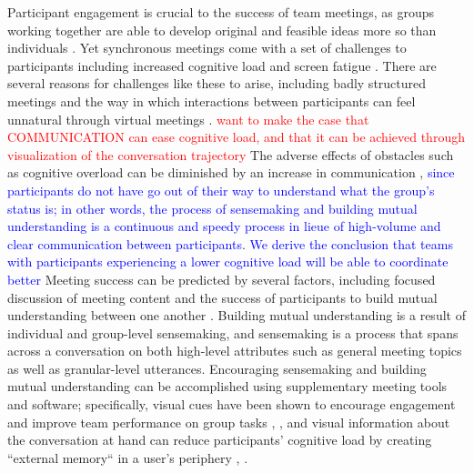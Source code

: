 Participant engagement is crucial to the success of team meetings, as groups working together are able to develop original and feasible ideas more so than individuals \cite{kohnBuildingIdeasOthers2011}. Yet synchronous meetings come with a set of challenges to participants including increased cognitive load and screen fatigue \cite{karl2021virtual}. There are several reasons for challenges like these to arise, including badly structured meetings and the way in which interactions between participants can feel unnatural through virtual meetings \cite{karl2021virtual}. \textcolor{red}{want to make the case that COMMUNICATION can ease cognitive load, and that it can be achieved through visualization of the conversation trajectory}
The adverse effects of obstacles such as cognitive overload can be diminished by an increase in communication \cite{fussellCoordinationOverloadTeam1998}, \textcolor{blue}{since participants do not have go out of their way to understand what the group's status is; in other words, the process of sensemaking and building mutual understanding is a continuous and speedy process in lieue of high-volume and clear communication between participants}. 
\textcolor{blue}{We derive the conclusion that teams with participants experiencing a lower cognitive load will be able to coordinate better}
Meeting success can be predicted by several factors, including focused discussion of meeting content \cite{fussellCoordinationOverloadTeam1998} and the success of participants to build mutual understanding between one another \cite{kecskesActivatingSeekingCreating2009}. Building mutual understanding is a result of individual and group-level sensemaking, and sensemaking is a process that spans across a conversation on both high-level attributes such as general meeting topics as well as granular-level utterances. Encouraging sensemaking and building mutual understanding can be accomplished using supplementary meeting tools and software; specifically, visual cues have been shown to encourage engagement and improve team performance on group tasks \cite{yuExploringHowWorkspace2022}, \cite{liuConsensUsSupportingMultiCriteria2018}, \cite{valkIdeationCompassSupporting2022} and visual information about the conversation at hand can reduce participants' cognitive load by creating ``external memory`` in a user's periphery \cite{kirshenbaum2021traces}, \cite{Pedersen1997AROMAAR}.

